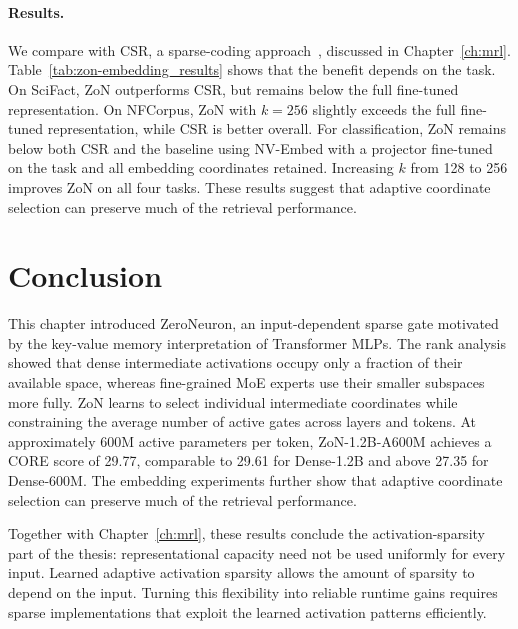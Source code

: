 \paragraph{Results.}
We compare with CSR, a sparse-coding approach~\citep{wen2025matryoshkarevisitingsparsecoding}, discussed in Chapter~\ref{ch:mrl}.
Table~\ref{tab:zon-embedding_results} shows that the benefit depends on the task.
On SciFact, ZoN outperforms CSR, but remains below the full
fine-tuned representation. On NFCorpus, ZoN with $k=256$ slightly exceeds
the full fine-tuned representation, while CSR is better overall.
For classification, ZoN remains below both CSR and the baseline using NV-Embed
with a projector fine-tuned on the task and all embedding coordinates retained.
Increasing $k$ from 128 to 256 improves ZoN on all four tasks.
These results suggest that adaptive coordinate selection can preserve much
of the retrieval performance.

\section{Conclusion}
This chapter introduced ZeroNeuron, an input-dependent sparse gate motivated by the
key-value memory interpretation of Transformer MLPs. The rank analysis showed that
dense intermediate activations occupy only a fraction of their available space,
whereas fine-grained MoE experts use their smaller subspaces more fully. ZoN learns
to select individual intermediate coordinates while constraining the average number
of active gates across layers and tokens. At approximately 600M active parameters per token, ZoN-1.2B-A600M achieves a CORE
score of 29.77, comparable to 29.61 for Dense-1.2B and above 27.35 for Dense-600M.
The embedding experiments further show that adaptive coordinate selection can
preserve much of the retrieval performance.

Together with Chapter~\ref{ch:mrl}, these results conclude the activation-sparsity
part of the thesis: representational capacity need not be used uniformly for every
input. Learned adaptive activation sparsity allows the amount of sparsity to depend on the input.
Turning this flexibility into reliable runtime gains requires sparse implementations that exploit the learned
activation patterns efficiently.
